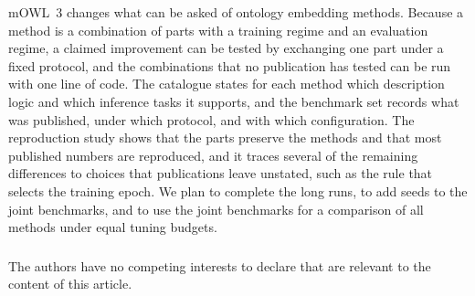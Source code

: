 \documentclass[runningheads]{llncs}
\begin{document}
mOWL~3 changes what can be asked of ontology embedding methods. Because a method is a
combination of parts with a training regime and an evaluation regime, a claimed
improvement can be tested by exchanging one part under a fixed protocol, and the
combinations that no publication has tested can be run with one line of code. The
catalogue states for each method which description logic and which inference tasks it
supports, and the benchmark set records what was published, under which protocol, and
with which configuration. The reproduction study shows that the parts preserve the
methods and that most published numbers are reproduced, and it traces several of the
remaining differences to choices that publications leave unstated, such as the rule that
selects the training epoch. We plan to complete the long runs, to add seeds to the joint
benchmarks, and to use the joint benchmarks for a comparison of all methods under equal
tuning budgets.

\begin{credits}


\subsubsection{\discintname} The authors have no competing interests to declare that are
relevant to the content of this article.
\end{credits}



\end{document}
